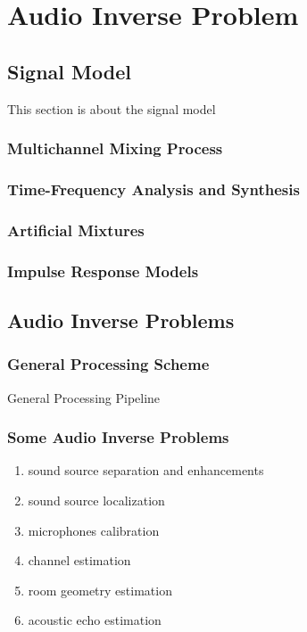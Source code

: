 \chapter{Audio Inverse Problem}\label{chap:processing}


\section{Signal Model}
This section is about the signal model


\subsection{Multichannel Mixing Process}

\subsection{Time-Frequency Analysis and Synthesis}

\subsection{Artificial Mixtures}

\subsection{Impulse Response Models}





\section{Audio Inverse Problems}

\subsection{General Processing Scheme}
General Processing Pipeline

\subsection{Some Audio Inverse Problems}
\begin{enumerate}
    \item sound source separation and enhancements
    \item sound source localization
    \item microphones calibration
    \item channel estimation
    \item room geometry estimation
    \item acoustic echo estimation
\end{enumerate}

